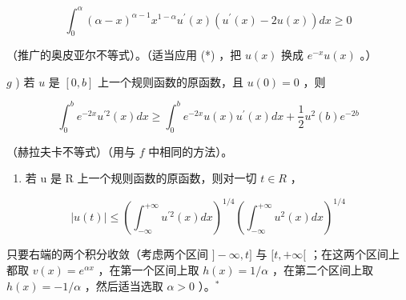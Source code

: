 \[
\int_ {0} ^ {\alpha} (\alpha - x) ^ {\alpha - 1} x ^ {1 - \alpha} u ^ {\prime} (x) \left(u ^ {\prime} (x) - 2 u (x)\right) d x \geqslant 0
\]

（推广的奥皮亚尔不等式）。（适当应用 (*) ，把 \(u(x)\) 换成 \(e^{-x}u(x)\) 。）

\(g\) ) 若 \(u\) 是 \([0,b]\) 上一个规则函数的原函数，且 \(u(0) = 0\) ，则

\[
\int_ {0} ^ {b} e ^ {- 2 x} u ^ {\prime 2} (x) d x \geqslant \int_ {0} ^ {b} e ^ {- 2 x} u (x) u ^ {\prime} (x) d x + \frac {1}{2} u ^ {2} (b) e ^ {- 2 b}
\]

（赫拉夫卡不等式）（用与 \(f\) 中相同的方法）。

\begin{enumerate}
\def\labelenumi{\alph{enumi})}
\setcounter{enumi}{7}
\tightlist
\item
  若 u 是 R 上一个规则函数的原函数，则对一切 \(t \in R\) ，
\end{enumerate}

\[
| u (t) | \leqslant \left(\int_ {- \infty} ^ {+ \infty} u ^ {\prime 2} (x) d x\right) ^ {1 / 4} \left(\int_ {- \infty} ^ {+ \infty} u ^ {2} (x) d x\right) ^ {1 / 4}
\]

只要右端的两个积分收敛（考虑两个区间 \(]-\infty,t]\) 与 \([t,+\infty[\) ；在这两个区间上都取 \(v(x)=e^{\alpha x}\) ，在第一个区间上取 \(h(x)=1/\alpha\) ，在第二个区间上取 \(h(x)=-1/\alpha\) ，然后适当选取 \(\alpha>0\) ）。\(^{*}\)

